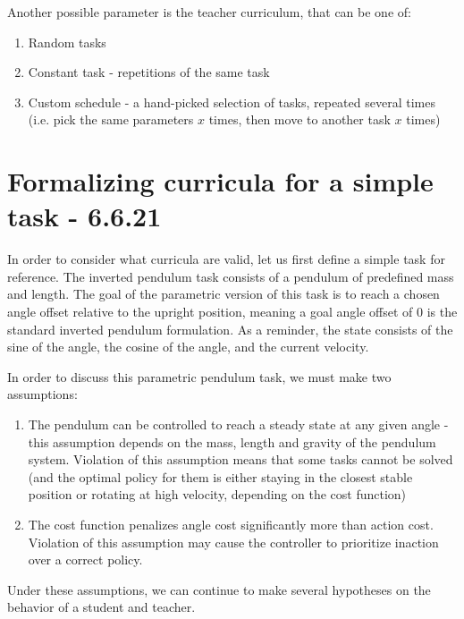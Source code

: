 \documentclass[letterpaper]{article}
\theoremstyle{definition}
\begin{document}
Another possible parameter is the teacher curriculum, that can be one of:
\begin{enumerate}
	\item Random tasks
	\item Constant task - repetitions of the same task
	\item Custom schedule - a hand-picked selection of tasks, repeated several times (i.e. pick the same parameters $x$ times, then move to another task $x$ times) 
\end{enumerate}

\section{Formalizing curricula for a simple task - 6.6.21} \label{sec:pendulum-dreams}

In order to consider what curricula are valid, let us first define a simple task for reference.
The inverted pendulum task consists of a pendulum of predefined mass and length.
The goal of the parametric version of this task is to reach a chosen angle offset relative to the upright position, meaning a goal angle offset of 0 is the standard inverted pendulum formulation.
As a reminder, the state consists of the sine of the angle, the cosine of the angle, and the current velocity.

In order to discuss this parametric pendulum task, we must make two assumptions:
\begin{enumerate}
	\item The pendulum can be controlled to reach a steady state at any given angle - this assumption depends on the mass, length and gravity of the pendulum system. Violation of this assumption means that some tasks cannot be solved (and the optimal policy for them is either staying in the closest stable position or rotating at high velocity, depending on the cost function)
	\item The cost function penalizes angle cost significantly more than action cost. Violation of this assumption may cause the controller to prioritize inaction over a correct policy.
\end{enumerate}
Under these assumptions, we can continue to make several hypotheses on the behavior of a student and teacher.
\end{document}
